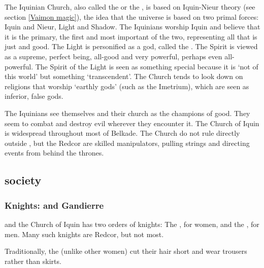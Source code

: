 The Iquinian Church, also called the  or the , is based on Iquin-Nieur theory (see section \ref{Vaimon magic}), the idea that the universe is based on two primal forces: Iquin and Nieur, Light and Shadow. The Iquinians worship Iquin and believe that it is the primary, the first and most important of the two, representing all that is just and good. %
The Light is personified as a god, called the . The Spirit is viewed as a supreme, perfect being, all-good and very powerful, perhaps even all-powerful. The Spirit of the Light is seen as something special because it is `not of this world' but something `transcendent'. The Church tends to look down on religions that worship `earthly gods' (such as the Imetrium), which are seen as inferior, false gods. 

The Iquinians see themselves and their church as the champions of good. They seem to combat and destroy evil wherever they encounter it. The Church of Iquin is widespread throughout most of Belkade. The Church do not rule directly outside \Redce{}, but the Redcor are skilled manipulators, pulling strings and directing events from behind the thrones. 

\subsection{\Redcean{} society}

\subsubsection{Knights: \Ryzin{} and Gandierre}
\Redce{} and the Church of Iquin has two orders of knights: The , for women, and the , for men. Many such knights are Redcor, but not most. 

Traditionally, the \Ryzin{} (unlike other \Redcean{} women) cut their hair short and wear trousers rather than skirts. 

